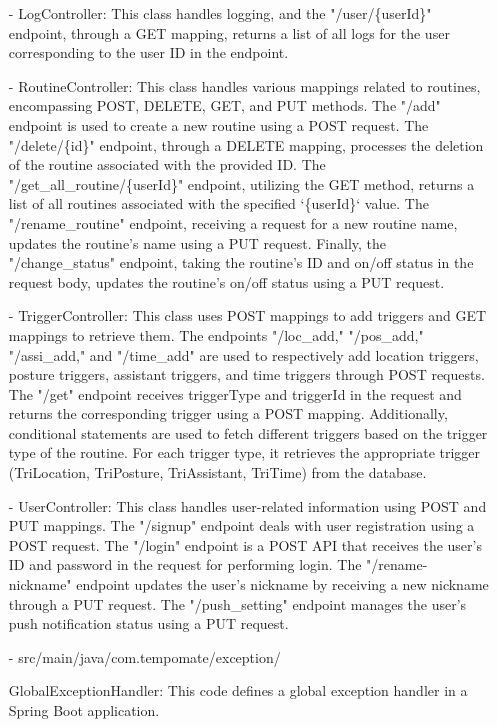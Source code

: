 \begin{enumerate}
    \item[-] LogController: This class handles logging, and the "/user/\{userId\}" endpoint, through a GET mapping, returns a list of all logs for the user corresponding to the user ID in the endpoint. \\
    \item[-] RoutineController: This class handles various mappings related to routines, encompassing POST, DELETE, GET, and PUT methods. The "/add" endpoint is used to create a new routine using a POST request. The "/delete/\{id\}" endpoint, through a DELETE mapping, processes the deletion of the routine associated with the provided ID. The "/get\_all\_routine/\{userId\}" endpoint, utilizing the GET method, returns a list of all routines associated with the specified `\{userId\}` value. The "/rename\_routine" endpoint, receiving a request for a new routine name, updates the routine's name using a PUT request. Finally, the "/change\_status" endpoint, taking the routine's ID and on/off status in the request body, updates the routine's on/off status using a PUT request. \\
    \item[-] TriggerController: This class uses POST mappings to add triggers and GET mappings to retrieve them. The endpoints "/loc\_add," "/pos\_add," "/assi\_add," and "/time\_add" are used to respectively add location triggers, posture triggers, assistant triggers, and time triggers through POST requests. The "/get" endpoint receives triggerType and triggerId in the request and returns the corresponding trigger using a POST mapping. Additionally, conditional statements are used to fetch different triggers based on the trigger type of the routine. For each trigger type, it retrieves the appropriate trigger (TriLocation, TriPosture, TriAssistant, TriTime) from the database. \\
    \item[-] UserController: This class handles user-related information using POST and PUT mappings. The "/signup" endpoint deals with user registration using a POST request. The "/login" endpoint is a POST API that receives the user's ID and password in the request for performing login. The "/rename-nickname" endpoint updates the user's nickname by receiving a new nickname through a PUT request. The "/push\_setting" endpoint manages the user's push notification status using a PUT request.\\
    \item[-] src/main/java/com.tempomate/exception/ \par GlobalExceptionHandler: This code defines a global exception handler in a Spring Boot application.\\

\end{enumerate}
